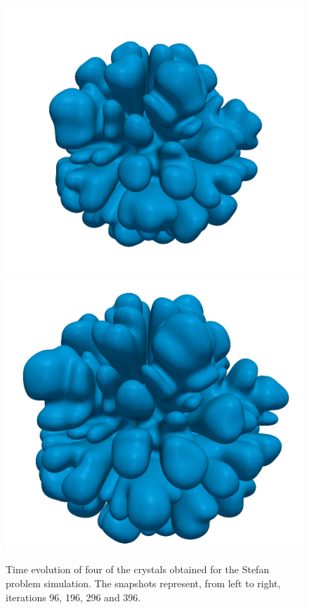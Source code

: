 \begin{figure}[ht!]
\begin{center}
{\includegraphics[width=.24\textwidth]{stefan/nb12_iter59.png}
\includegraphics[width=.24\textwidth]{stefan/nb12_iter79.png}
}
\caption{Time evolution of four of the crystals obtained for the Stefan problem simulation. The snapshots represent, from left to right, iterations 96, 196, 296 and 396.} \label{fig:stefan_evolution}
\end{center}
\end{figure}
